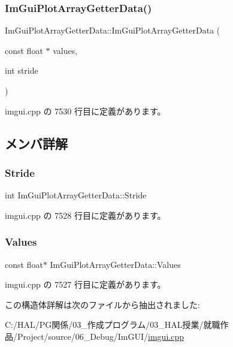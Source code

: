 \subsubsection{\texorpdfstring{Im\+Gui\+Plot\+Array\+Getter\+Data()}{ImGuiPlotArrayGetterData()}}
{\footnotesize\ttfamily Im\+Gui\+Plot\+Array\+Getter\+Data\+::\+Im\+Gui\+Plot\+Array\+Getter\+Data (\begin{DoxyParamCaption}\item[{const float $\ast$}]{values,  }\item[{int}]{stride }\end{DoxyParamCaption})\hspace{0.3cm}{\ttfamily [inline]}}



 imgui.\+cpp の 7530 行目に定義があります。



\subsection{メンバ詳解}
\mbox{\label{struct_im_gui_plot_array_getter_data_aecb2cce4ea91d95ec81937de656cfcd6}} 
\subsubsection{\texorpdfstring{Stride}{Stride}}
{\footnotesize\ttfamily int Im\+Gui\+Plot\+Array\+Getter\+Data\+::\+Stride}



 imgui.\+cpp の 7528 行目に定義があります。

\mbox{\label{struct_im_gui_plot_array_getter_data_aa40ff2e945549744fc622891089ae0fd}} 
\subsubsection{\texorpdfstring{Values}{Values}}
{\footnotesize\ttfamily const float$\ast$ Im\+Gui\+Plot\+Array\+Getter\+Data\+::\+Values}



 imgui.\+cpp の 7527 行目に定義があります。



この構造体詳解は次のファイルから抽出されました\+:\begin{DoxyCompactItemize}
\item 
C\+:/\+H\+A\+L/\+P\+G関係/03\+\_\+作成プログラム/03\+\_\+\+H\+A\+L授業/就職作品/\+Project/source/06\+\_\+\+Debug/\+Im\+G\+U\+I/\mbox{\hyperlink{imgui_8cpp}{imgui.\+cpp}}\end{DoxyCompactItemize}
